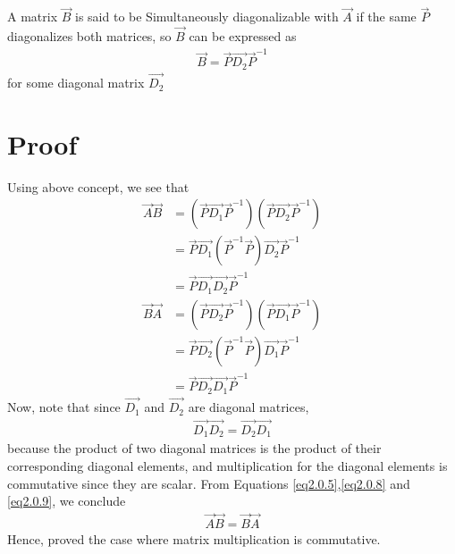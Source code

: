 \documentclass[journal,12pt,twocolumn]{IEEEtran}
\begin{document}
A matrix $\vec{B}$ is said to be Simultaneously diagonalizable with $\vec{A}$ if the same $\vec{P}$ diagonalizes both matrices, so $\vec{B}$ can be expressed as
\begin{align}\label{eq2}
    \vec{B} = \vec{P}\vec{D_2}\vec{P}^{-1}
\end{align}
for some diagonal matrix $\vec{D_2}$
\section{Proof}
Using above concept, we see that
\begin{align}
    \vec{A}\vec{B} & = (\vec{P}\vec{D_1}\vec{P}^{-1})(\vec{P}\vec{D_2}\vec{P}^{-1})\\& =\vec{P}\vec{D_1}(\vec{P}^{-1}\vec{P})\vec{D_2}\vec{P}^{-1}\\& = \label{eq2.0.5} \vec{P}\vec{D_1}\vec{D_2}\vec{P}^{-1}
\end{align}
\begin{align}
    \vec{B}\vec{A} & = (\vec{P}\vec{D_2}\vec{P}^{-1})(\vec{P}\vec{D_1}\vec{P}^{-1})\\& =\vec{P}\vec{D_2}(\vec{P}^{-1}\vec{P})\vec{D_1}\vec{P}^{-1}\\& = \label{eq2.0.8} \vec{P}\vec{D_2}\vec{D_1}\vec{P}^{-1}
\end{align}
Now, note that since $\vec{D_1}$ and $\vec{D_2}$ are diagonal matrices,
\begin{align}\label{eq2.0.9}
    \vec{D_1}\vec{D_2} = \vec{D_2}\vec{D_1}
\end{align}
because the product of two diagonal matrices is the product of their corresponding diagonal elements, and multiplication for the diagonal elements is commutative since they are scalar.
From Equations \eqref{eq2.0.5},\eqref{eq2.0.8} and \eqref{eq2.0.9}, we conclude
\begin{align}
    \vec{A}\vec{B} = \vec{B}\vec{A}
\end{align}
Hence, proved the case where matrix multiplication is commutative.
\end{document}
